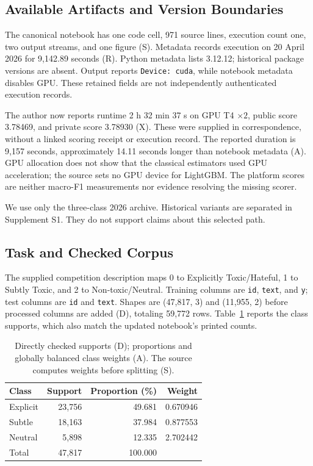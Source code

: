 \documentclass[doublecolumn]{ijcvsplatex}
\begin{document}
\subsection{Available Artifacts and Version Boundaries}
The canonical notebook has one code cell, 971 source lines, execution count one, two output streams, and one figure (S). Metadata records execution on 20 April 2026 for 9,142.89 seconds (R). Python metadata lists 3.12.12; historical package versions are absent. Output reports \texttt{Device: cuda}, while notebook metadata disables GPU. These retained fields are not independently authenticated execution records.

The author now reports runtime 2 h 32 min 37 s on GPU T4 $\times2$, public score 3.78469, and private score 3.78930 (X). These were supplied in correspondence, without a linked scoring receipt or execution record. The reported duration is 9,157 seconds, approximately 14.11 seconds longer than notebook metadata (A). GPU allocation does not show that the classical estimators used GPU acceleration; the source sets no GPU device for LightGBM. The platform scores are neither macro-F1 measurements nor evidence resolving the missing scorer.

We use only the three-class 2026 archive. Historical variants are separated in Supplement S1. They do not support claims about this selected path.

\subsection{Task and Checked Corpus}
The supplied competition description maps 0 to Explicitly Toxic/Hateful, 1 to Subtly Toxic, and 2 to Non-toxic/Neutral. Training columns are \texttt{id}, \texttt{text}, and \texttt{y}; test columns are \texttt{id} and \texttt{text}. Shapes are (47,817, 3) and (11,955, 2) before processed columns are added (D), totaling 59,772 rows. Table~\ref{tab:supports} reports the class supports, which also match the updated notebook's printed counts.

\begin{table}[t]
\small\centering
\caption{Directly checked supports (D); proportions and globally balanced class weights (A). The source computes weights before splitting (S).}
\label{tab:supports}
\begin{tabular}{lrrr}
\toprule
Class & Support & Proportion (\%) & Weight \\
\midrule
Explicit & 23,756 & 49.681 & 0.670946 \\
Subtle & 18,163 & 37.984 & 0.877553 \\
Neutral & 5,898 & 12.335 & 2.702442 \\
\midrule
Total & 47,817 & 100.000 & \\
\bottomrule
\end{tabular}
\end{table}
\end{document}
